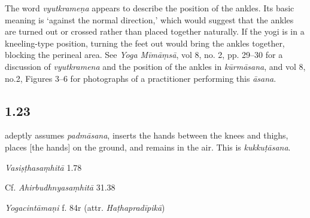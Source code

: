 \begin{ekdosis}
\begin{philcomm}[hp01_022]
The word \emph{vyutkrameṇa} appears to describe the position of the ankles. Its basic meaning is ‘against the normal direction,’ which would suggest that the ankles are turned out or crossed rather than placed together naturally. If the yogi is in a kneeling-type position, turning the feet out would bring the ankles together, blocking the perineal area. See \emph{Yoga Mīmāṃsā}, vol 8, no. 2, pp. 29–30 for a discussion of \emph{vyutkramena} and the position of the ankles in \emph{kūrmāsana}, and vol 8, no.2, Figures 3–6 for photographs of a practitioner performing this \emph{āsana}. 
\end{philcomm}

\subsection*{1.23}
\begin{translation} adeptly assumes \emph{padmāsana}, inserts the hands between the knees and thighs, places [the hands] on the ground, and remains in the air. This is \emph{kukkuṭāsana}.
\end{translation}

\begin{sources}[hp01_023]
\emph{Vasiṣṭhasaṃhitā} 1.78

\begin{versinnote}
\end{versinnote}

Cf. \emph{Ahirbudhnyasaṃhitā} 31.38

\begin{versinnote}
\end{versinnote}

\end{sources}

\begin{testimonia}[hp01_023]
\emph{Yogacintāmaṇi} f. 84r (attr. \emph{Haṭhapradīpikā})

\begin{versinnote}
\end{versinnote}


\end{testimonia}
\end{ekdosis}
